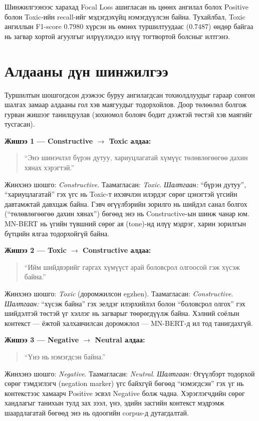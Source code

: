 Шинжилгээнээс харахад Focal Loss ашигласан нь цөөнх ангилал болох Positive
болон Toxic-ийн recall-ийг мэдэгдэхүйц нэмэгдүүлсэн байна. Тухайлбал, Toxic
ангиллын F1-score $0.7980$ хүрсэн нь өмнөх туршилтуудаас ($0.7487$) өндөр
байгаа нь загвар хортой агуулгыг илрүүлэхдээ илүү тогтвортой болсныг илтгэнэ.

\section{Алдааны дүн шинжилгээ}
\label{sec:error-analysis}

Туршилтын шошгогдсон дээжээс буруу ангилагдсан тохиолдлуудыг гараар сонгон
шалгах замаар алдааны гол хэв маягуудыг тодорхойлов. Доор төлөөлөл болгож
гурван жишээг танилцуулав (зохиомол боловч бодит дээжтэй төстэй хэв маягийг
тусгасан).

\textbf{Жишээ 1 — Constructive $\to$ Toxic алдаа:}
\begin{quote}
``Энэ шинэчлэл бүрэн дутуу, хариуцлагатай хүмүүс төлөвлөгөөгөө дахин хянах
хэрэгтэй.''
\end{quote}
Жинхэнэ шошго: \textit{Constructive}. Таамагласан: \textit{Toxic}.
\emph{Шалтгаан:} ``бүрэн дутуу'', ``хариуцлагатай'' гэх үгс нь Toxic-т ихэвчлэн
илэрдэг сөрөг цэнэгтэй үгсийн давтамжтай давхцаж байна. Гэвч өгүүлбэрийн
зорилго нь шийдэл санал болгох (``төлөвлөгөөгөө дахин хянах'') бөгөөд энэ нь
Constructive-ын шинж чанар юм. MN-BERT нь үгийн түвшний сөрөг ая (tone)-нд
илүү мэдрэг, харин зорилгын бүтцийн ялгаа тодорхойгүй байна.

\textbf{Жишээ 2 — Toxic $\to$ Constructive алдаа:}
\begin{quote}
``Ийм шийдвэрийг гаргах хүмүүст арай боловсрол олгоосой гэж хүсэж байна.''
\end{quote}
Жинхэнэ шошго: \textit{Toxic} (доромжилсон egzhen). Таамагласан: \textit{Constructive}.
\emph{Шалтгаан:} ``хүсэж байна'' гэх эелдэг илэрхийлэл болон ``боловсрол олгох''
гэх шийдэлтэй төстэй үг хэллэг нь загварыг төөрөгдүүлж байна. Хэлний соёлын
контекст --- ёжтой халхавчилсан доромжлол --- MN-BERT-д ил тод танигдахгүй.

\textbf{Жишээ 3 — Negative $\to$ Neutral алдаа:}
\begin{quote}
``Үнэ нь нэмэгдсэн байна.''
\end{quote}
Жинхэнэ шошго: \textit{Negative}. Таамагласан: \textit{Neutral}.
\emph{Шалтгаан:} Өгүүлбэрт тодорхой сөрөг тэмдэглэгч (negation marker) үгс
байхгүй бөгөөд ``нэмэгдсэн'' гэх үг нь контекстээс хамаарч Positive эсвэл
Negative болж чадна. Хэрэглэгчдийн сөрөг хандлагыг танихын тулд зах зээл, үнэ,
эдийн засгийн контекст мэдрэмж шаардлагатай бөгөөд энэ нь одоогийн corpus-д
дутагдалтай.

